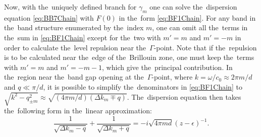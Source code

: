 
Now, with the~uniquely defined branch for $\gamma_m$ one can solve the~dispersion equation \cref{eq:BB7Chain} with $F(0)$ in the~form \cref{eq:BF1Chain}.
For any band in the~band structure enumerated by the~index $m$, one can omit all the~terms in the~sum in \cref{eq:BF1Chain} except for the~two with $m'=m$ and $m'=-m$ in order to calculate the~level repulsion near the~$\Gamma$-point.
Note that if the~repulsion is to be calculated near the~edge of the~Brillouin zone, one must keep the~terms with $m'=m$ and $m'=-m-1$, which give the~principal contribution.
In the~region near the~band gap opening at the~$\Gamma$-point, where $k = \omega/c_0 \approx 2\pi m/d$ and $q \ll \pi/d$, it is possible to simplify the~denominators in \cref{eq:BF1Chain} to $\sqrt{k^2- q_{\pm m}^2} \approx \sqrt{(4\pi m/d)(\Delta k_m \mp q)}$.
The~dispersion equation then takes the~following form in the~linear approximation:
\begin{equation}
\label{eq:B15Chain}
\frac{1}{\sqrt{\Delta k_m - q}} + \frac{1}{\sqrt{\Delta k_m + q}} = -i\sqrt{4\pi m d}\left(z - \epsilon\right)^{-1}.
\end{equation}

